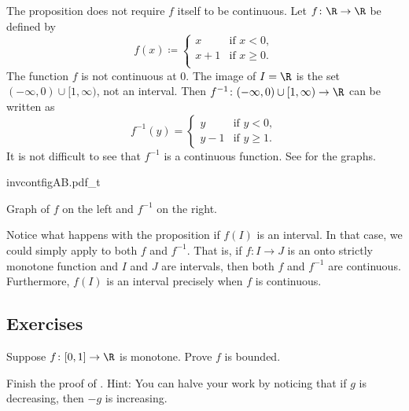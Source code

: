 \begin{example}
The proposition does not require $f$ itself to be continuous.  Let
$f \colon \R \to \R$ be defined by
\begin{equation*}
f(x) \coloneqq
\begin{cases}
x & \text{if } x < 0, \\
x+1 & \text{if } x \geq 0. \\
\end{cases}
\end{equation*}
The function $f$ is not continuous at $0$.
The image of $I = \R$ is the set 
$(-\infty,0)\cup [1,\infty)$, not an interval.
Then $f^{-1} \colon (-\infty,0)\cup [1,\infty)
\to \R$ can be written as
\begin{equation*}
f^{-1}(y) =
\begin{cases}
y & \text{if } y < 0, \\
y-1 & \text{if } y \geq 1. 
\end{cases}
\end{equation*}
It is not difficult to see that $f^{-1}$ is a continuous function.  See
 for the graphs.
\begin{myfigureht}
{invcontfigAB.pdf_t}
\caption{Graph of $f$ on the left and $f^{-1}$ on the right.\label{invcontfig}}
\end{myfigureht}
\end{example}

Notice what happens with the proposition if $f(I)$ is an interval.
In that case, we could simply
apply  to both $f$ and $f^{-1}$.  That is, if
$f \colon I \to J$ is an onto strictly monotone function and $I$ and $J$ are intervals,
then both $f$ and $f^{-1}$ are continuous.  Furthermore, $f(I)$ is an
interval precisely when $f$ is continuous.

\subsection{Exercises}

\begin{exercise}
Suppose $f \colon [0,1] \to \R$ is monotone.  Prove $f$ is bounded.
\end{exercise}

\begin{exercise}
Finish the proof of .
Hint: You can halve your work by noticing that if $g$ is decreasing,
then $-g$ is increasing.
\end{exercise}

